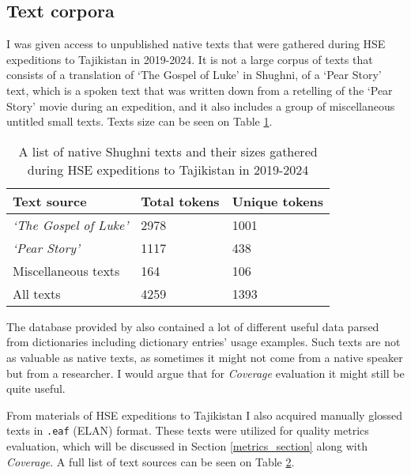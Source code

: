 \subsection{Text corpora} \label{text_corpora}
I was given access to unpublished native texts that were gathered during HSE expeditions to Tajikistan in 2019-2024. It is not a large corpus of texts that consists of a translation of `The Gospel of Luke' in Shughni, of a `Pear Story' text, which is a spoken text that was written down from a retelling of the `Pear Story' movie during an expedition, and it also includes a group of miscellaneous untitled small texts. Texts size can be seen on Table \hyperref[Tab:native_texts]{1}.

\begin{table}[!h]
    \begin{center}
        \begin{tabular}{|l|l|l|}
            \hline
            \textbf{Text source} & \textbf{Total tokens} & \textbf{Unique tokens} \\
            \hline
            \textit{`The Gospel of Luke'} & 2978 & 1001 \\
            \textit{`Pear Story'} & 1117 & 438 \\
            Miscellaneous texts & 164 & 106 \\
            \hline
            All texts & 4259 & 1393 \\
            \hline
        \end{tabular}
        \caption{A list of native Shughni texts and their sizes gathered during HSE expeditions to Tajikistan in 2019-2024}
        \label{Tab:native_texts}
    \end{center}
\end{table}

The database provided by \textcite{makarov_digital_2022} also contained a lot of different useful data parsed from dictionaries including dictionary entries' usage examples. Such texts are not as valuable as native texts, as sometimes it might not come from a native speaker but from a researcher. I would argue that for \textit{Coverage} evaluation it might still be quite useful. 

From materials of HSE expeditions to Tajikistan I also acquired manually glossed texts in \texttt{.eaf} (ELAN) format. These texts were utilized for quality metrics evaluation, which will be discussed in Section \ref{metrics_section} along with \textit{Coverage}. A full list of text sources can be seen on Table \hyperref[Tab:all_texts]{2}.

